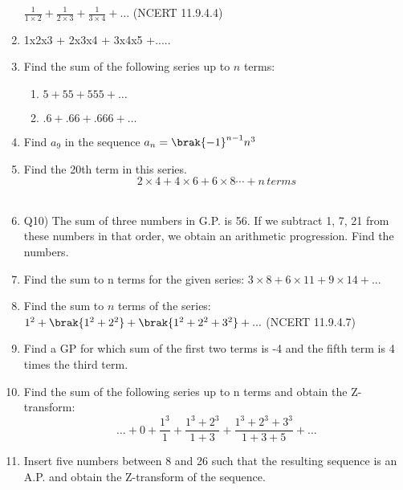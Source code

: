 \begin{enumerate}[label=\thesection.\arabic*,ref=\thesection.\theenumi]
$\frac{1}{1 \times 2} + \frac{1}{2 \times 3} + \frac{1}{3 \times 4} + \ldots$ \hfill(NCERT 11.9.4.4)
\solution
\pagebreak
\item 1x2x3 + 2x3x4 + 3x4x5 +..... \\
\solution
\pagebreak
\item  Find the sum of the following series up to \(n\) terms:
          \begin{enumerate}
              \item $5 + 55 + 555 + \ldots$
              \item  $.6 + .66 + .666 + \ldots$
        \end{enumerate}

\solution
\pagebreak
\item Find $a_{9}$ in the sequence $a_{n}=\brak{-1}^{n-1}n^{3}$ \\
\solution
\pagebreak
\item Find the 20th term in this series.\\
$$2\times4+4\times6+6\times8\cdots+n\,terms$$ \\
\solution
\pagebreak

\item Q10) The sum of three numbers in G.P. is 56. If we subtract 1, 7, 21 from these numbers in that order, we obtain an arithmetic progression. Find the numbers.\\
\solution
\item  Find the sum to n terms for the given series: $3\times8 + 6\times11 + 9\times14 + ...$
\solution
\pagebreak
\item Find the sum to $n$ terms of the series:\\
$1^2+\brak{1^2+2^2}+\brak{1^2+2^2+3^2}+...$ \hfill(NCERT 11.9.4.7)\\
\solution

\pagebreak
\item Find a GP for which sum of the first two terms is -4 and the fifth term is 4 times the third term.\\
\solution

\pagebreak

\item Find the sum of the following series up to n terms and obtain the Z-transform: 
$$\ldots + 0 + \frac{1^3}{1} + \frac{1^3 + 2^3}{1 + 3} + \frac{1^3 + 2^3 + 3^3}{1 + 3 + 5} + \ldots$$
\solution
\pagebreak
\item Insert five numbers between 8 and 26 such that the resulting sequence is an A.P. and obtain the Z-transform of the sequence.
\pagebreak


\end{enumerate}
